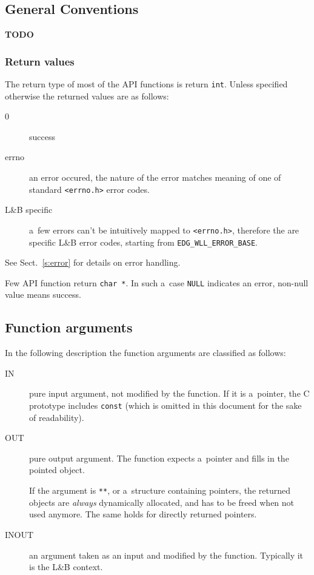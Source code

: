 \documentclass{egee}
\def\LB{L\&B\xspace}
\begin{document}
\subsection{General Conventions}

\textbf{TODO}

\subsubsection{Return values}
The return type of most of the API functions is return \verb'int'.
Unless specified otherwise the returned values are as follows:
\begin{description}
\item[0] success
\item[errno] an error occured, the nature of the error
matches meaning of one of standard \verb'<errno.h>' error codes.
\item[\LB specific] a~few errors can't be intuitively mapped to \verb'<errno.h>', therefore the are specific \LB error codes, starting from \verb'EDG_WLL_ERROR_BASE'.
\end{description}
See Sect.~\ref{s:error} for details on error handling.

Few API function return \verb'char *'. In such a~case \verb'NULL' indicates
an error, non-null value means success.

\subsection{Function arguments}
In the following description the function arguments are classified as follows:
\begin{description}
\item[IN] pure input argument, not modified by the function.
If it is a~pointer, the C prototype includes \verb'const' (which is omitted in
this document for the sake of readability).
\item[OUT] pure output argument. The function expects a~pointer and fills in
the pointed object.

If the argument is \verb'**', or a~structure containing pointers,
the returned objects are \emph{always} dynamically allocated,
and has to be freed when not used anymore.
The same holds for directly returned pointers.

\item[INOUT] an argument taken as an input and modified by the function.
Typically it is the \LB context.

\end{description}
\end{document}
